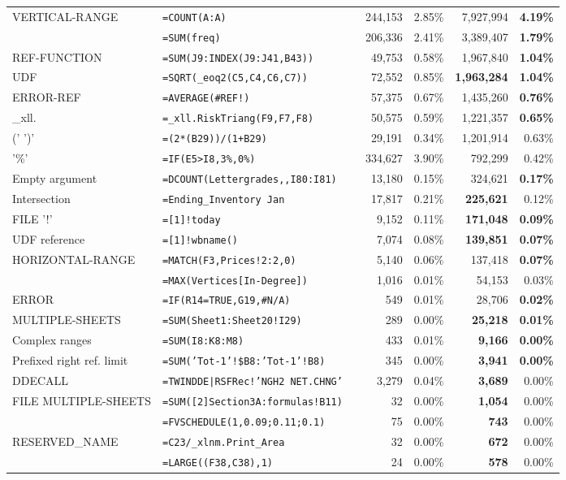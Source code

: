 \begin{tabular}{llrrrrr}
			VERTICAL-RANGE & \texttt{=COUNT(A:A)} &  & 244,153 & 2.85\% & 7,927,994 & \textbf{4.19\%}\\
			\synt{NamedRange} & \texttt{=SUM(freq)} &  & 206,336 & 2.41\% & 3,389,407 & \textbf{1.79\%}\\
			REF-FUNCTION & \texttt{=SUM(J9:INDEX(J9:J41,B43))} &  & 49,753 & 0.58\% & 1,967,840 & \textbf{1.04\%}\\
			UDF & \texttt{=SQRT(_eoq2(C5,C4,C6,C7))} &  & 72,552 & 0.85\% & \textbf{1,963,284} & \textbf{1.04\%}\\
			ERROR-REF & \texttt{=AVERAGE(\#REF!)} &  & 57,375 & 0.67\% & 1,435,260 & \textbf{0.76\%}\\
			_xll. & \texttt{=_xll.RiskTriang(F9,F7,F8)} &  & 50,575 & 0.59\% & 1,221,357 & \textbf{0.65\%}\\
			(' \synt{Reference} ')' & \texttt{=(2*(B29))/(1+B29)} &  & 29,191 & 0.34\% & 1,201,914 & 0.63\%\\
			'\%' & \texttt{=IF(E5>I8,3\%,0\%)} &  & 334,627 & 3.90\% & 792,299 & 0.42\%\\
			Empty argument & \texttt{=DCOUNT(Lettergrades,,I80:I81)} &  & 13,180 & 0.15\% & 324,621 & \textbf{0.17\%}\\
			Intersection & \texttt{=Ending_Inventory Jan} &  & 17,817 & 0.21\% & \textbf{225,621} & 0.12\%\\
			FILE '!' & \texttt{=[1]!today} &  & 9,152 & 0.11\% & \textbf{171,048} & \textbf{0.09\%}\\
			UDF reference & \texttt{=[1]!wbname()} &  & 7,074 & 0.08\% & \textbf{139,851} & \textbf{0.07\%}\\
			HORIZONTAL-RANGE & \texttt{=MATCH(F3,Prices!2:2,0)} &  & 5,140 & 0.06\% & 137,418 & \textbf{0.07\%}\\
			\synt{StructureReference} & \texttt{=MAX(Vertices[In-Degree])} &  & 1,016 & 0.01\% & 54,153 & 0.03\%\\
			ERROR & \texttt{=IF(R14=TRUE,G19,\#N/A)} &  & 549 & 0.01\% & 28,706 & \textbf{0.02\%}\\
			MULTIPLE-SHEETS & \texttt{=SUM(Sheet1:Sheet20!I29)} &  & 289 & 0.00\% & \textbf{25,218} & \textbf{0.01\%}\\
			Complex ranges & \texttt{=SUM(I8:K8:M8)} &  & 433 & 0.01\% & \textbf{9,166} & \textbf{0.00\%}\\
			Prefixed right ref. limit & \texttt{=SUM('Tot-1'!\$B8:'Tot-1'!B8)} &  & 345 & 0.00\% & \textbf{3,941} & \textbf{0.00\%}\\
			DDECALL & \texttt{=TWINDDE|RSFRec!'NGH2 NET.CHNG'} &  & 3,279 & 0.04\% & \textbf{3,689} & 0.00\%\\
			FILE MULTIPLE-SHEETS & \texttt{=SUM([2]Section3A:formulas!B11)} &  & 32 & 0.00\% & \textbf{1,054} & 0.00\%\\
			\synt{ConstantArray} & \texttt{=FVSCHEDULE(1,{0.09;0.11;0.1})} &  & 75 & 0.00\% & \textbf{743} & 0.00\%\\
			RESERVED_NAME & \texttt{=C23/_xlnm.Print_Area} &  & 32 & 0.00\% & \textbf{672} & 0.00\%\\
			\synt{Union} & \texttt{=LARGE((F38,C38),1)} &  & 24 & 0.00\% & \textbf{578} & 0.00\%\\
			\hline
	\end{tabular}